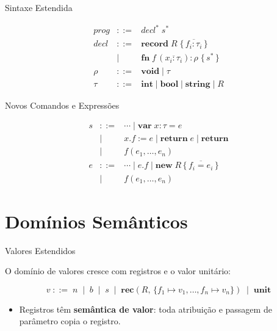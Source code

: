 \begin{frame}{Sintaxe Estendida}

    \[\begin{array}{lcl}
    \mathit{prog}  &::=& \mathit{decl}^*\; s^* \\[4pt]
    \mathit{decl}  &::=& \mathbf{record}\; R\; \{\, \overline{f_i \mathbin{:} \tau_i}\,\} \\
    &\mid& \mathbf{fn}\; f\,(\overline{x_i \mathbin{:} \tau_i}) \mathbin{:} \rho\; \{\, s^*\,\} \\[4pt]
    \rho           &::=& \mathbf{void} \mid \tau \\[4pt]
    \tau           &::=& \mathbf{int} \mid \mathbf{bool} \mid \mathbf{string} \mid R
\end{array}\]
\end{frame}

\begin{frame}{Novos Comandos e Expressões}

    \[\begin{array}{lcl}
    s &::=& \cdots \mid \mathbf{var}\; x \mathbin{:} \tau \mathbin{=} e \\
    &\mid& x.f \mathbin{:=} e \mid \mathbf{return}\; e \mid \mathbf{return} \\
    &\mid& f(e_1,\ldots,e_n) \\[4pt]
    e &::=& \cdots \mid e.f \mid \mathbf{new}\; R\,\{\,\overline{f_i \mathbin{=} e_i}\,\} \\
    &\mid& f(e_1,\ldots,e_n)
\end{array}\]
\end{frame}


\section{Domínios Semânticos}\label{domuxednios-semuxe2nticos}

\begin{frame}{Valores Estendidos}

    O domínio de valores cresce com registros e o valor unitário:

    \[v \;::=\; n \;\mid\; b \;\mid\; s \;\mid\;
    \mathbf{rec}(R,\, \{f_1 \mapsto v_1, \ldots, f_n \mapsto v_n\})
    \;\mid\; \mathbf{unit}\]

    \begin{itemize}

        \item
        Registros têm \textbf{semântica de valor}: toda atribuição e passagem
        de parâmetro copia o registro.
    \end{itemize}
\end{frame}

